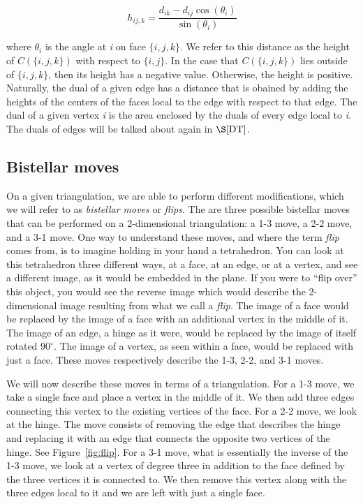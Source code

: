 \documentclass[12pt]{article}
\begin{document}
\begin{equation}
\label{eq3}
h_{ij,k} = \frac{d_{ik} - d_{ij}\cos(\theta_i)}{\sin(\theta_i)}
\end{equation}

\noindent where $\theta_i$ is the angle at \textit{i} on face $\{i, j, k\}$. We refer to this distance as the height of $C(\{i, j, k\})$ with respect to $\{i, j\}$. In the case that $C(\{i, j, k\})$ lies outside of $\{i, j, k\}$, then its height has a negative value. Otherwise, the height is positive\cite{Dave}. Naturally, the dual of a given edge has a distance that is obained by adding the heights of the centers of the faces local to the edge with respect to that edge. The dual of a given vertex \textit{i} is the area enclosed by the duals of every edge local to \textit{i}. The duals of edges will be talked about again in $\S\ref{DT}$.\newline

\subsection{Bistellar moves}

\noindent On a given triangulation, we are able to perform different modifications, which we will refer to as \textit{bistellar moves} or \textit{flips}. The are three possible bistellar moves that can be performed on a 2-dimensional triangulation: a 1-3 move, a 2-2 move, and a 3-1 move. One way to understand these moves, and where the term \textit{flip} comes from, is to imagine holding in your hand a tetrahedron. You can look at this tetrahedron three different ways, at a face, at an edge, or at a vertex, and see a different image, as it would be embedded in the plane. If you were to ``flip over'' this object, you would see the reverse image which would describe the 2-dimensional image resulting from what we call a \textit{flip}. The image of a face would be replaced by the image of a face with an additional vertex in the middle of it. The image of an edge, a hinge as it were, would be replaced by the image of itself rotated $90^\circ$. The image of a vertex, as seen within a face, would be replaced with just a face. These moves respectively describe the 1-3, 2-2, and 3-1 moves.\newline

\noindent We will now describe these moves in terms of a triangulation. For a 1-3 move, we take a single face and place a vertex in the middle of it. We then add three edges connecting this vertex to the existing vertices of the face. For a 2-2 move, we look at the hinge. The move consists of removing the edge that describes the hinge and replacing it with an edge that connects the opposite two vertices of the hinge. See Figure~\ref{fig:flip}. For a 3-1 move, what is essentially the inverse of the 1-3 move, we look at a vertex of degree three in addition to the face defined by the three vertices it is connected to. We then remove this vertex along with the three edges local to it and we are left with just a single face.
\end{document}
